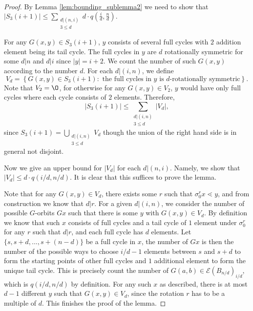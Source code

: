 \documentclass[10 pt]{amsart}
\theoremstyle{plain}
\theoremstyle{definition}
\theoremstyle{remark}
\numberwithin{equation}{section}
\begin{document}
\begin{proof} 


By Lemma \ref{lem:bounding_sublemma2} we need to show that $\displaystyle |S_3(i+1)| \le \sum_{\substack{d | (n , i) \\ 3 \le d }} d \cdot q \left(\frac{i}{d},\frac{n}{d}\right)  .$ 


For any $G(x, y) \in S_3(i+1)$, $y$ consists of several full cycles with $2$ addition element being its tail cycle. The full cycles in $y$ are $d$ rotationally symmetric for some $d | n$ and $d | i$ since $|y| = i+2$. We count the number of such $G(x,y)$ according to the number $d$. For each $d| (i, n)$, we define $$V_d = \left\{G(x, y) \in S_3(i+1) : \text{ the full cycles in $y$ is $d$-rotationally symmetric} \right\}.$$ Note that $V_2 = \O$, for otherwise for any $G(x, y) \in V_2$, $y$ would have only full cycles where each cycle consists of $2$ elements. Therefore, $$|S_3(i+1)| \le \displaystyle \sum_{\substack{d| (i, n) \\ 3 \le d}} |V_d|,$$ since $S_3(i+1) = \bigcup_{\substack{d| (i, n) \\ 3 \le d}} V_d$ though the union of the right hand side is in general not disjoint. 

Now we give an upper bound for $|V_d|$ for each $d | (n, i)$. Namely, we show that $|V_d| \le d \cdot q (i/d, n/d)$. It is clear that this suffices to prove the lemma.

Note that for any $G(x, y) \in V_d$, there exists some $r$ such that $\sigma_0^r x \lessdot y$, and from construction we know that $d | r$. For a given $d | (i, n)$, we consider the number of possible $G$-orbits $Gx$ such that there is some $y$ with $G(x, y) \in V_d$. By definition we know that such $x$ consists of full cycles and a tail cycle of $1$ element under $\sigma_0^r$ for any $r$ such that $d |r$, and each full cycle has $d$ elements. Let $\{s, s+d, ..., s+(n-d)\}$ be a full cycle in $x$, the number of $Gx$ is then the number of the possible ways to choose $i/d -1$ elements between $s$ and $s+d$ to form the starting points of other full cycles and $1$ additional element to form the unique tail cycle. This is precisely count the number of $G(a,b) \in \mathcal E (B_{n/d})_{i/d}$, which is $q(i/d, n/d)$ by definition. For any such $x$ as described, there is at most $d-1$ different $y$ such that $G(x,y) \in V_d$, since the rotation $r$ has to be a multiple of $d$. This finishes the proof of the lemma.
\end{proof}


\end{document}
